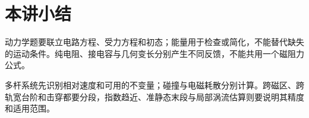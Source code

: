 \section{本讲小结}
动力学题要联立电路方程、受力方程和初态；能量用于检查或简化，不能替代缺失的运动条件。纯电阻、接电容与几何变长分别产生不同反馈，不能共用一个磁阻力公式。

多杆系统先识别相对速度和可用的不变量；碰撞与电磁耗散分别计算。跨磁区、跨轨宽台阶和击穿都要分段，指数趋近、准静态末段与局部涡流估算则要说明其精度和适用范围。
